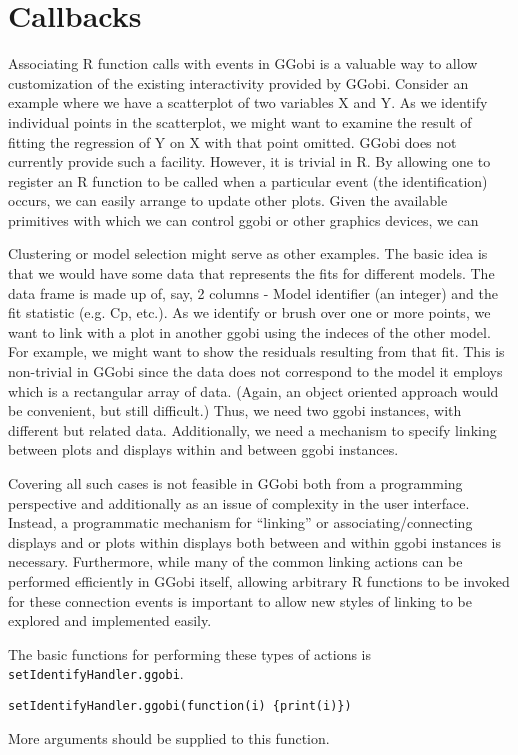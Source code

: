 \documentclass{article}
\def\SFunction#1{{\texttt{\red #1}}}
\begin{document}
\section{Callbacks}

Associating R function calls with events in GGobi
is a valuable way to allow customization of the existing interactivity
provided by GGobi.  Consider an example where we have a scatterplot of
two variables X and Y.  As we identify individual points in the
scatterplot, we might want to examine the result of fitting the
regression of Y on X with that point omitted.  GGobi does not
currently provide such a facility.  However, it is trivial in R.  By
allowing one to register an R function to be called when a particular
event (the identification) occurs, we can easily arrange to update
other plots.  Given the available primitives with which we can control
ggobi or other graphics devices, we can

Clustering or model selection might serve as other examples.  The
basic idea is that we would have some data that represents the fits
for different models.  The data frame is made up of, say, 2 columns -
Model identifier (an integer) and the fit statistic (e.g. Cp, etc.).
As we identify or brush over one or more points, we want to link with
a plot in another ggobi using the indeces of the other model.  For
example, we might want to show the residuals resulting from that fit.
This is non-trivial in GGobi since the data does not correspond to the
model it employs which is a rectangular array of data.  (Again, an
object oriented approach would be convenient, but still difficult.)
Thus, we need two ggobi instances, with different but related data.
Additionally, we need a mechanism to specify linking between plots and
displays within and between ggobi instances.

Covering all such cases is not feasible in GGobi both from a
programming perspective and additionally as an issue of complexity in
the user interface.  Instead, a programmatic mechanism for ``linking''
or associating/connecting displays and or plots within displays both
between and within ggobi instances is necessary.  Furthermore, while
many of the common linking actions can be performed efficiently in
GGobi itself, allowing arbitrary R functions to be invoked for these
connection events is important to allow new styles of linking to be
explored and implemented easily.


The basic functions for performing these types of actions
is \SFunction{setIdentifyHandler.ggobi}.
\begin{verbatim}
setIdentifyHandler.ggobi(function(i) {print(i)})
\end{verbatim}
More arguments should be supplied to this function. 
\end{document}
